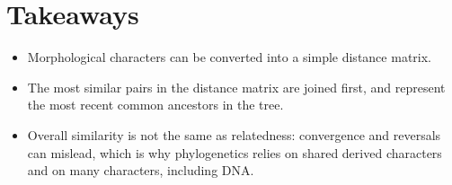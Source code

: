 \documentclass[
  a4paper]{book}
\providecommand{\tightlist}{%
  \setlength{\itemsep}{0pt}\setlength{\parskip}{0pt}}
\begin{document}
\section{Takeaways}\label{takeaways-26}

\begin{itemize}
\tightlist
\item
  Morphological characters can be converted into a simple distance matrix.
\item
  The most similar pairs in the distance matrix are joined first, and represent the most recent common ancestors in the tree.
\item
  Overall similarity is not the same as relatedness: convergence and reversals can mislead, which is why phylogenetics relies on shared derived characters and on many characters, including DNA.
\end{itemize}


\end{document}
